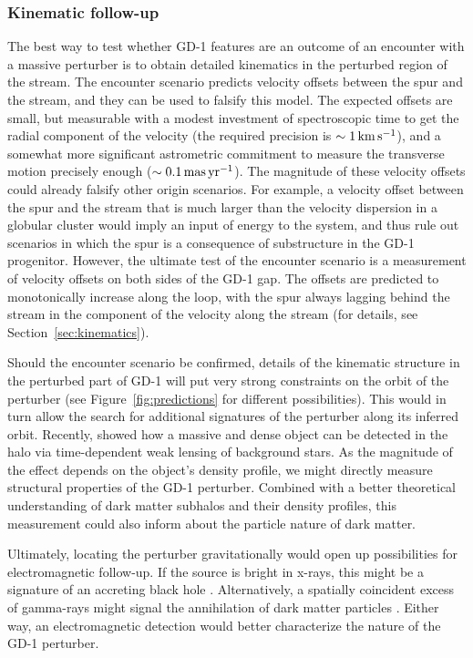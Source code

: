 \documentclass[twocolumn]{aastex62}
\begin{document}
\subsubsection{Kinematic follow-up}
The best way to test whether GD-1 features are an outcome of an encounter with a massive perturber is to obtain detailed kinematics in the perturbed region of the stream.
The encounter scenario predicts velocity offsets between the spur and the stream, and they can be used to falsify this model.
The expected offsets are small, but measurable with a modest investment of spectroscopic time to get the radial component of the velocity (the required precision is $\sim1\,\rm km\,s^{-1}$), and a somewhat more significant astrometric commitment to measure the transverse motion precisely enough ($\sim0.1\,\rm mas\,yr^{-1}$).
The magnitude of these velocity offsets could already falsify other origin scenarios.
For example, a velocity offset between the spur and the stream that is much larger than the velocity dispersion in a globular cluster would imply an input of energy to the system, and thus rule out scenarios in which the spur is a consequence of substructure in the GD-1 progenitor.
However, the ultimate test of the encounter scenario is a measurement of velocity offsets on both sides of the GD-1 gap.
The offsets are predicted to monotonically increase along the loop, with the spur always lagging behind the stream in the component of the velocity along the stream (for details, see Section~\ref{sec:kinematics}).

Should the encounter scenario be confirmed, details of the kinematic structure in the perturbed part of GD-1 will put very strong constraints on the orbit of the perturber (see Figure~\ref{fig:predictions} for different possibilities).
This would in turn allow the search for additional signatures of the perturber along its inferred orbit.
Recently, \citet{vantilburg2018} showed how a massive and dense object can be detected in the halo via time-dependent weak lensing of background stars.
As the magnitude of the effect depends on the object's density profile, we might directly measure structural properties of the GD-1 perturber.
Combined with a better theoretical understanding of dark matter subhalos and their density profiles, this measurement could also inform about the particle nature of dark matter.

Ultimately, locating the perturber gravitationally would open up possibilities for electromagnetic follow-up.
If the source is bright in x-rays, this might be a signature of an accreting black hole \citep[e.g.,][]{bailyn1995}.
Alternatively, a spatially coincident excess of gamma-rays might signal the annihilation of dark matter particles \citep[similarly to the results of searches at the locations of dwarf galaxies, e.g.,][]{hooper2015}.
Either way, an electromagnetic detection would better characterize the nature of the GD-1 perturber.
\end{document}
